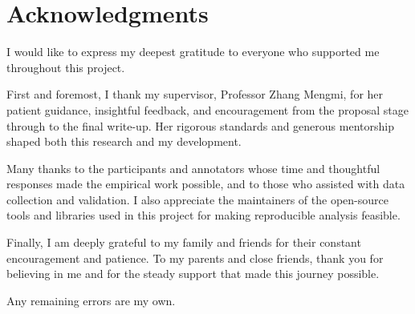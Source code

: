 \chapter*{Acknowledgments}

I would like to express my deepest gratitude to everyone who supported me throughout
this project.

First and foremost, I thank my supervisor, Professor Zhang Mengmi, for her
patient guidance, insightful feedback, and encouragement from the proposal
stage through to the final write-up. Her rigorous standards and generous mentorship
shaped both this research and my development.

Many thanks to the participants and annotators whose time and thoughtful responses
made the empirical work possible, and to those who assisted with data collection
and validation. I also appreciate the maintainers of the open-source
tools and libraries used in this project for making reproducible analysis feasible.

Finally, I am deeply grateful to my family and friends for their constant encouragement
and patience. To my parents and close friends, thank you for believing in me and for
the steady support that made this journey possible.

Any remaining errors are my own.